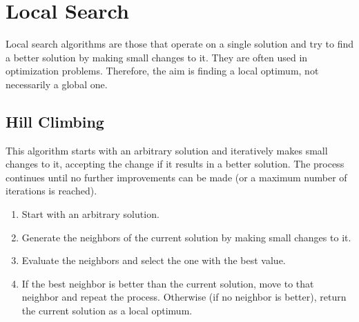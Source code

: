 \section{Local Search}

Local search algorithms are those that operate on a single solution and try to find a better solution by making small changes to it. They are often used in optimization problems. Therefore, the aim is finding a local optimum, not necessarily a global one.

\subsection{Hill Climbing}

This algorithm starts with an arbitrary solution and iteratively makes small changes to it, accepting the change if it results in a better solution. The process continues until no further improvements can be made (or a maximum number of iterations is reached).
\begin{enumerate}
    \item Start with an arbitrary solution.
    \item Generate the neighbors of the current solution by making small changes to it.
    \item Evaluate the neighbors and select the one with the best value.
    \item If the best neighbor is better than the current solution, move to that neighbor and repeat the process. Otherwise (if no neighbor is better), return the current solution as a local optimum.
\end{enumerate}

